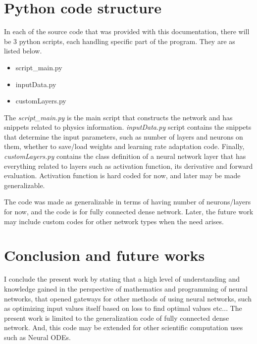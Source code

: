 \section{Python code structure}
\par{}
In each of the source code that was provided with this documentation,
there will be 3 python scripts, each handling specific part of the program.
They are as listed below.
\begin{itemize}
    \item script\_main.py
    \item inputData.py
    \item customLayers.py
\end{itemize}

\par{}
The \textit{script\_main.py} is the main script that constructs the network and
has snippets related to physics information. \textit{inputData.py} script
contains the snippets that determine the input parameters, such as number of
layers and neurons on them, whether to save/load weights and learning rate
adaptation code. Finally, \textit{customLayers.py} contains the class
definition of a neural network layer that has everything related to layers such
as activation function, its derivative and forward evaluation. Activation function
is hard coded for now, and later may be made generalizable. \\

\par{}
The code was made as generalizable in terms of having number of neurons/layers
for now, and the code is for fully connected dense network. Later, the future
work may include custom codes for other network types when the need arises. \\


\section{Conclusion and future works}
\par{}
I conclude the present work by stating that a high level of understanding and
knowledge gained in the perspective of mathematics and programming of neural
networks, that opened gateways for other methods of using neural networks,
such as optimizing input values itself based on loss to find optimal
values etc... The present work is limited to the generalization code of
fully connected dense network. And, this code may be extended for other
scientific computation uses such as Neural ODEs.
